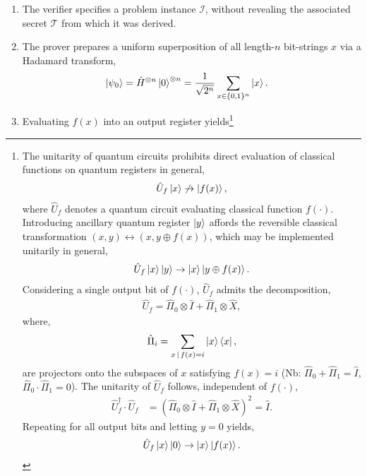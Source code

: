 \begin{enumerate}
	\item The verifier specifies a problem instance $\mathcal{I}$, without revealing the associated secret $\mathcal{T}$ from which it was derived.
	\item The prover prepares a uniform superposition of all length-$n$ bit-strings $x$ via a Hadamard transform,
	      \begin{align}
		      \ket{\psi_0} &= \hat{H}^{\otimes n} \ket{0}^{\otimes n} = \frac{1}{\sqrt{2^n}} \sum_{x\in\{0,1\}^n} \ket{x}.
	      \end{align}
	\item Evaluating $f(x)$ into an output register yields\footnote{The unitarity of quantum circuits prohibits direct evaluation of classical functions on quantum registers in general,
		      \begin{align}
			      \hat{U}_f\ket{x}\not\to\ket{f(x)},\nonumber
		      \end{align}
		      where $\hat{U}_f$ denotes a quantum circuit evaluating classical function $f(\cdot)$. Introducing ancillary quantum register $\ket{y}$ affords the reversible classical transformation $(x,y)\leftrightarrow(x,y\oplus f(x))$, which may be implemented unitarily in general,
		      \begin{align}
			      \hat{U}_f\ket{x}\ket{y}\to\ket{x}\ket{y\oplus f(x)}.\nonumber
		      \end{align}
		      Considering a single output bit of $f(\cdot)$, $\hat{U}_f$ admits the decomposition,
		      \begin{align}
			      \hat{U}_f = \hat\Pi_0\otimes \hat{I} + \hat\Pi_1\otimes \hat{X},\nonumber
		      \end{align}
		      where,
		      \begin{align}
			      \hat\Pi_i = \sum_{x\,|\,f(x)=i}\ket{x}\bra{x},\nonumber
		      \end{align}
		      are projectors onto the subspaces of $x$ satisfying \mbox{$f(x)=i$} (Nb: \mbox{$\hat\Pi_0+\hat\Pi_1=\hat{I}$}, \mbox{$\hat\Pi_0\cdot\hat\Pi_1=0$}). The unitarity of $\hat{U}_f$ follows, independent of $f(\cdot)$,
		      \begin{align}
			      \hat{U}_f^\dag \cdot \hat{U}_f & = (\hat\Pi_{0}\otimes \hat{I} + \hat\Pi_1\otimes \hat{X})^2 = \hat{I}.\nonumber
		      \end{align}
		      Repeating for all output bits and letting \mbox{$y=0$} yields,
		      \begin{align}
			      \hat{U}_f\ket{x}\ket{0}\to\ket{x}\ket{f(x)}.\nonumber

\end{align}}
\end{enumerate}
